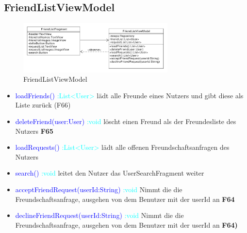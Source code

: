 \subsection{FriendListViewModel}
\begin{figure}[H]
	\centering
	\includegraphics[width=0.7\textwidth]{pics/viewModel/Friend_List_ViewModel.pdf}%
	\caption{FriendListViewModel}%
	\label{viewModel}%
\end{figure}
\begin{itemize}
	\item \textcolor{blue}{loadFriends()} \textcolor{cyan}{:List<User>} lädt alle Freunde eines Nutzers und gibt diese als Liste zurück (F66)
	\item \textcolor{blue}{deleteFriend(user:User)} \textcolor{cyan}{:void} löscht einen Freund als der Freundesliste des Nutzers \textbf{F65}
	\item  \textcolor{blue}{loadRequests()} \textcolor{cyan}{:List<User>} lädt alle offenen Freundschaftsanfragen des Nutzers
	\item \textcolor{blue}{search()} \textcolor{cyan}{:void} leitet den Nutzer das UserSearchFragment weiter
	
	\item \textcolor{blue}{acceptFriendRequest(userId:String)} \textcolor{cyan}{:void} Nimmt die die Freundschaftsanfrage, ausgehen von dem Benutzer mit der userId an \textbf{F64}
	
	\item \textcolor{blue}{declineFriendRequest(userId:String)} \textcolor{cyan}{:void} Nimmt die die Freundschaftsanfrage, ausgehen von dem Benutzer mit der userId an \textbf{F64)}

\end{itemize}


